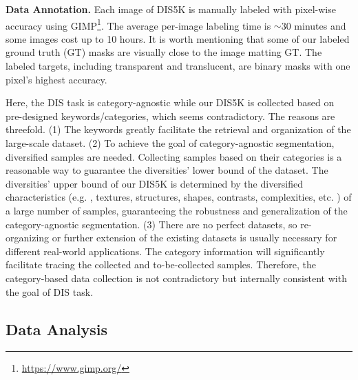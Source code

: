 \textbf{Data Annotation.} Each image of DIS5K is manually labeled with pixel-wise accuracy using {GIMP}\footnote{\url{https://www.gimp.org/}}. 
The average per-image labeling time is $\sim$30 minutes and some images cost up to 10 hours. It is worth mentioning that some of our labeled ground truth (GT) masks are visually close to the image matting GT. The labeled targets, including transparent and translucent, are binary masks with one pixel's highest accuracy. 

Here, the DIS task is category-agnostic while our DIS5K is collected based on pre-designed keywords/categories, which seems contradictory. The reasons are threefold. (1) The keywords greatly facilitate the retrieval and organization of the large-scale dataset. (2) To achieve the goal of category-agnostic segmentation, diversified samples are needed. Collecting samples based on their categories is a reasonable way to guarantee the diversities' lower bound of the dataset. The diversities' upper bound of our DIS5K is determined by the diversified characteristics (e.g. , textures, structures, shapes, contrasts, complexities, etc. ) of a large number of samples, guaranteeing the robustness and generalization of the category-agnostic segmentation. (3) There are no perfect datasets, so re-organizing or further extension of the existing datasets is usually necessary for different real-world applications. The category information will significantly facilitate tracing the collected and to-be-collected samples. Therefore, the category-based data collection is not contradictory but internally consistent with the goal of DIS task. 

\subsection{Data Analysis}\label{sec:DA}

